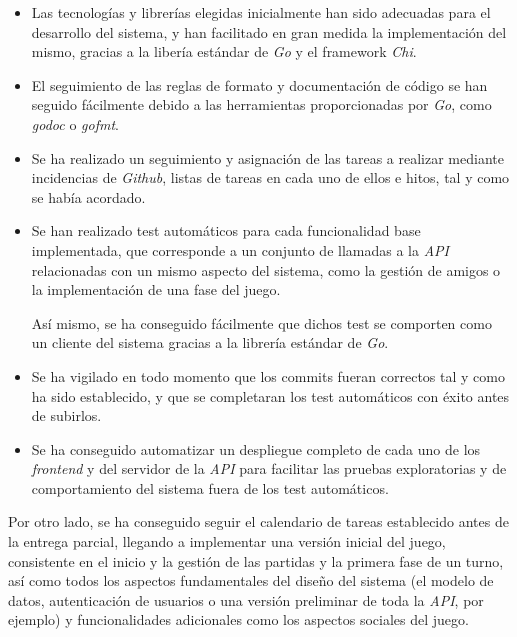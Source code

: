 \documentclass[11pt, a4paper, titlepage]{article}
\begin{document}
\begin{itemize}
    \item Las tecnologías y librerías elegidas inicialmente han sido adecuadas para el desarrollo del sistema, y han facilitado en gran medida la implementación del mismo, gracias a la libería estándar de \textit{Go} y el framework \textit{Chi}.

    \item El seguimiento de las reglas de formato y documentación de código se han seguido fácilmente debido a las herramientas proporcionadas por \textit{Go}, como \textit{godoc} o \textit{gofmt}.

    \item Se ha realizado un seguimiento y asignación de las tareas a realizar mediante incidencias de \textit{Github},  listas de tareas en cada uno de ellos e hitos, tal y como se había acordado.

    \item Se han realizado test automáticos para cada funcionalidad base implementada, que corresponde a un conjunto de llamadas a la \textit{API} relacionadas con un mismo aspecto del sistema, como la gestión de amigos o la implementación de una fase del juego.

    Así mismo, se ha conseguido fácilmente que dichos test se comporten como un cliente del sistema gracias a la librería estándar de \textit{Go}.

    \item Se ha vigilado en todo momento que los commits fueran correctos tal y como ha sido establecido, y que se completaran los test automáticos con éxito antes de subirlos.

    \item Se ha conseguido automatizar un despliegue completo de cada uno de los \textit{frontend} y del servidor de la \textit{API} para facilitar las pruebas exploratorias y de comportamiento del sistema fuera de los test automáticos.
\end{itemize}


Por otro lado, se ha conseguido seguir el calendario de tareas establecido antes de la entrega parcial, llegando a implementar una versión inicial del juego, consistente en el inicio y la gestión de las partidas y la primera fase de un turno, así como todos los aspectos fundamentales del diseño del sistema (el modelo de datos, autenticación de usuarios o una versión preliminar de toda la \textit{API}, por ejemplo) y funcionalidades adicionales como los aspectos sociales del juego.\\
\end{document}

